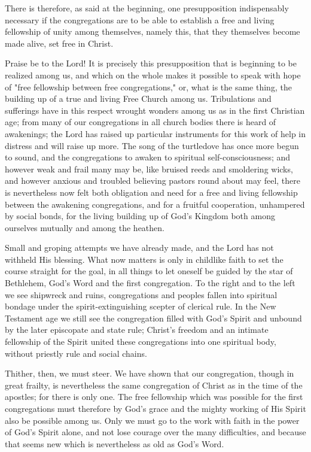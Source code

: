 There is therefore, as said at the beginning, one presupposition indispensably necessary if the congregations are to be able to establish a free and living fellowship of unity among themselves, namely this, that they themselves become made alive, set free in Christ.

Praise be to the Lord! It is precisely this presupposition that is beginning to be realized among us, and which on the whole makes it possible to speak with hope of "free fellowship between free congregations," or, what is the same thing, the building up of a true and living Free Church among us. Tribulations and sufferings have in this respect wrought wonders among us as in the first Christian age; from many of our congregations in all church bodies there is heard of awakenings; the Lord has raised up particular instruments for this work of help in distress and will raise up more. The song of the turtledove has once more begun to sound, and the congregations to awaken to spiritual self-consciousness; and however weak and frail many may be, like bruised reeds and smoldering wicks, and however anxious and troubled believing pastors round about may feel, there is nevertheless now felt both obligation and need for a free and living fellowship between the awakening congregations, and for a fruitful cooperation, unhampered by social bonds, for the living building up of God's Kingdom both among ourselves mutually and among the heathen.

Small and groping attempts we have already made, and the Lord has not withheld His blessing. What now matters is only in childlike faith to set the course straight for the goal, in all things to let oneself be guided by the star of Bethlehem, God's Word and the first congregation. To the right and to the left we see shipwreck and ruins, congregations and peoples fallen into spiritual bondage under the spirit-extinguishing scepter of clerical rule. In the New Testament age we still see the congregation filled with God's Spirit and unbound by the later episcopate and state rule; Christ's freedom and an intimate fellowship of the Spirit united these congregations into one spiritual body, without priestly rule and social chains.

Thither, then, we must steer. We have shown that our congregation, though in great frailty, is nevertheless the same congregation of Christ as in the time of the apostles; for there is only one. The free fellowship which was possible for the first congregations must therefore by God's grace and the mighty working of His Spirit also be possible among us. Only we must go to the work with faith in the power of God's Spirit alone, and not lose courage over the many difficulties, and because that seems new which is nevertheless as old as God's Word.

